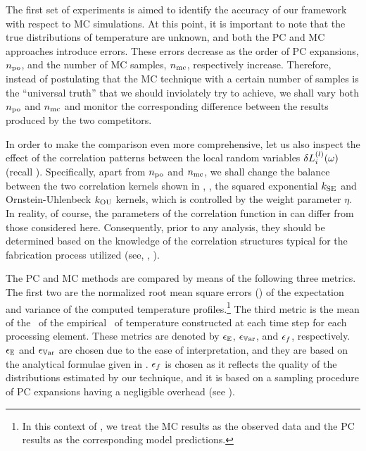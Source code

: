 The first set of experiments is aimed to identify the accuracy of our framework with respect to MC simulations.
At this point, it is important to note that the true distributions of temperature are unknown, and both the PC and MC approaches introduce errors.
These errors decrease as the order of PC expansions, ${n_\text{po}}$, and the number of MC samples, ${n_\text{mc}}$, respectively increase.
Therefore, instead of postulating that the MC technique with a certain number of samples is the ``universal truth'' that we should inviolately try to achieve, we shall vary both ${n_\text{po}}$ and ${n_\text{mc}}$ and monitor the corresponding difference between the results produced by the two competitors.

In order to make the comparison even more comprehensive, let us also inspect the effect of the correlation patterns between the local random variables $\delta L^{(l)}_i(\omega)$ (recall ).
Specifically, apart from ${n_\text{po}}$ and ${n_\text{mc}}$, we shall change the balance between the two correlation kernels shown in , \ie, the squared exponential $\fCorr_\SE$ and Ornstein-Uhlenbeck $\fCorr_\OU$ kernels, which is controlled by the weight parameter $\eta$.
In reality, of course, the parameters of the correlation function in  can differ from those considered here.
Consequently, prior to any analysis, they should be determined based on the knowledge of the correlation structures typical for the fabrication process utilized (see, \eg, \cite{ghanta2006, friedberg2005}).

The PC and MC methods are compared by means of the following three metrics.
The first two are the normalized root mean square errors (\nrmses) of the expectation and variance of the computed temperature profiles.\footnote{In this context of \nrmses, we treat the MC results as the observed data and the PC results as the corresponding model predictions.}
The third metric is the mean of the \nrmses\ of the empirical \pdfs\ of temperature constructed at each time step for each processing element.
These metrics are denoted by $\epsilon_\mathbb{E}$, $\epsilon_{\mathbb{V}\text{ar}}$, and $\epsilon_f$, respectively.
$\epsilon_\mathbb{E}$ and $\epsilon_{\mathbb{V}\text{ar}}$ are chosen due to the ease of interpretation, and they are based on the analytical formulae given in .
$\epsilon_f$ is chosen as it reflects the quality of the distributions estimated by our technique, and it is based on a sampling procedure of PC expansions having a negligible overhead (see ).

